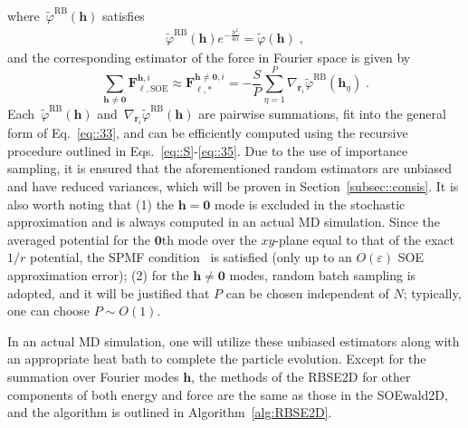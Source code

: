 where~$\widetilde{\varphi}^{\text{RB}}({\bm{h}})$ satisfies
\begin{equation}
	\begin{split}
		\widetilde{\varphi}^{\text{RB}}({\bm{h}}) e^{ - \frac{h^2}{4\alpha}} = \widetilde{\varphi}({\bm{h}}) \;,
	\end{split}
\end{equation}
and the corresponding estimator of the force in Fourier space is given by
\begin{equation}
	\sum_{\bm{h}\neq\bm{0}}\bm{F}_{\ell,\text{SOE}}^{\bm{h},i}\approx \bm{F}_{\ell,*}^{\bm{h}\neq\bm{0},i}=-\frac{S}{P} \sum_{\eta=1}^{P}\nabla_{\bm{r}_{i}}\widetilde{\varphi}^{\text{RB}}(\bm{h}_{\eta})\;.
\end{equation}
Each~$\widetilde{\varphi}^{\text{RB}}({\bm{h}})$ and~$\nabla_{\bm{r}_{i}}\widetilde{\varphi}^{\text{RB}}(\bm{h})$ are pairwise summations, fit into the general form of Eq.~\eqref{eq::33}, and can be efficiently computed using the recursive procedure outlined in Eqs.~\eqref{eq::S}-\eqref{eq::35}. 
Due to the use of importance sampling, it is ensured that the aforementioned random estimators are unbiased and have reduced variances, which will be proven in Section~\ref{subsec::consis}.
It is also worth noting that (1) the $\bm h=\bm 0$ mode is excluded in the stochastic approximation and is always computed in an actual MD simulation. Since the averaged potential for the $\bm 0$th mode over the $xy$-plane equal to that of the exact $1/r$ potential, the SPMF condition~\cite{hu2014symmetry} is satisfied (only up to an $O(\varepsilon)$ SOE approximation error); (2) for the  $\bm h\neq \bm 0$ modes, random batch sampling is adopted, and it will be justified that $P$ can be chosen independent of $N$; typically, one can choose $P\sim O(1)$.


In an actual MD simulation, one will utilize these unbiased estimators along with an appropriate heat bath to complete the particle evolution.  
Except for the summation over Fourier modes $\bm{h}$, the methods of the RBSE2D for other components of both energy and force are the same as those in the SOEwald2D, and the algorithm is outlined in Algorithm~\ref{alg:RBSE2D}.

